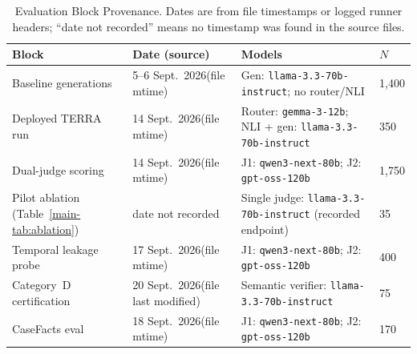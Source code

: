 \par\begingroup
  
  \small
  
  
  \begin{longtable}{@{}p{3.8cm}p{2.2cm}p{5.2cm}p{1.4cm}@{}}
\caption{Evaluation Block Provenance. Dates are from file timestamps or
           logged runner headers; ``date not recorded'' means no timestamp
           was found in the source files.}\label{tab:run_provenance}\\
    \toprule
    \textbf{Block} & \textbf{Date (source)} & \textbf{Models} & \textbf{$N$} \\
    \midrule
    Baseline generations & 5--6 Sept.\ 2026\newline (file mtime) &
      Gen: \texttt{llama-\allowbreak{}3.3-\allowbreak{}70b-\allowbreak{}instruct}; no router/NLI &
      1,400 \\
    \addlinespace
    Deployed TERRA run & 14 Sept.\ 2026\newline (file mtime) &
      Router: \texttt{gemma-\allowbreak{}3-\allowbreak{}12b}; NLI + gen: \texttt{llama-\allowbreak{}3.3-\allowbreak{}70b-\allowbreak{}instruct} &
      350 \\
    \addlinespace
    Dual-judge scoring & 14 Sept.\ 2026\newline (file mtime) &
      J1: \texttt{qwen3-\allowbreak{}next-\allowbreak{}80b}; J2: \texttt{gpt-\allowbreak{}oss-\allowbreak{}120b} &
      1,750 \\
    \addlinespace
    Pilot ablation (Table~\ref{main-tab:ablation}) & date not recorded &
      Single judge: \texttt{llama-\allowbreak{}3.3-\allowbreak{}70b-\allowbreak{}instruct} (recorded endpoint) & 35 \\
    \addlinespace
    Temporal leakage probe & 17 Sept.\ 2026\newline (file mtime) &
      J1: \texttt{qwen3-\allowbreak{}next-\allowbreak{}80b}; J2: \texttt{gpt-\allowbreak{}oss-\allowbreak{}120b} & 400 \\
    \addlinespace
    Category~D certification & 20 Sept.\ 2026\newline (file last modified) &
      Semantic verifier: \texttt{llama-\allowbreak{}3.3-\allowbreak{}70b-\allowbreak{}instruct} & 75 \\
    \addlinespace
    CaseFacts eval & 18 Sept.\ 2026\newline (file mtime) &
      J1: \texttt{qwen3-\allowbreak{}next-\allowbreak{}80b}; J2: \texttt{gpt-\allowbreak{}oss-\allowbreak{}120b} & 170 \\

\end{longtable}
